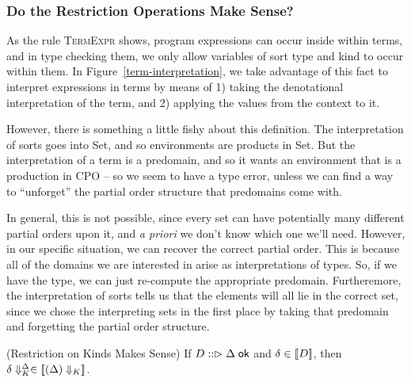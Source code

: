 \subsubsection{Do the Restriction Operations Make Sense?}

As the rule \textsc{TermExpr} shows, program expressions can occur
inside within terms, and in type checking them, we only allow
variables of sort type and kind to occur within them. In
Figure~\ref{term-interpretation}, we take advantage of this fact to
interpret expressions in terms by means of 1) taking the denotational
interpretation of the term, and 2) applying the values from the
context to it.

However, there is something a little fishy about this definition.  The
interpretation of sorts goes into Set, and so environments are
products in Set. But the interpretation of a term is a predomain, and
so it wants an environment that is a production in CPO -- so we seem
to have a type error, unless we can find a way to ``unforget'' the
partial order structure that predomains come with. 

In general, this is not possible, since every set can have potentially
many different partial orders upon it, and \emph{a priori} we don't
know which one we'll need. However, in our specific situation, we can
recover the correct partial order. This is because all of the domains
we are interested in arise as interpretations of types. So, if we have
the type, we can just re-compute the appropriate predomain. Furtheremore, the
interpretation of sorts tells us that the elements will all lie in the
correct set, since we chose the interpreting sets in the first place by 
taking that predomain and forgetting the partial order structure. 

\begin{lemma}{(Restriction on Kinds Makes Sense)}
If $D :: \vartriangleright {\Delta} \;\mathsf{ok}$ and $\delta \in [\![{D}]\!]$, then 
${\delta}\Downarrow^{\Delta}_K \in [\![{({\Delta})\Downarrow_K}]\!]$. 
\end{lemma}

